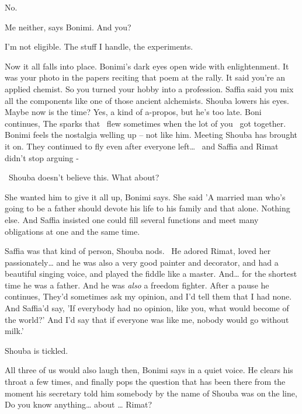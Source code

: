 \documentclass[letterpaper]{article}
\begin{document}
{\textquotedbl}No.{\textquotedbl}

{\textquotedbl}Me neither,{\textquotedbl} says Bonimi. {\textquotedbl}And you?{\textquotedbl} 

{\textquotedbl}I'm not eligible. The stuff I handle, the experiments.{\textquotedbl}

{\textquotedbl}Now it all falls into place.{\textquotedbl} Bonimi's dark eyes open wide with enlightenment.
{\textquotedbl}It was your photo in the papers reciting that poem at the rally. It said you're an applied chemist. So
you turned your hobby into a profession. Saffia said you mix all the components like one of those ancient
alchemists.{\textquotedbl} Shouba lowers his eyes. Maybe now is the time? Yes, a kind of a-propos, but he's too late.
Boni continues, {\textquotedbl}The sparks that \ flew sometimes when the lot of you \ got together.{\textquotedbl}
Bonimi feels the nostalgia welling up -- not like him. Meeting Shouba has brought it on. {\textquotedbl}They continued
to fly even after everyone left{\dots} \ and Saffia and Rimat didn't stop arguing -{\textquotedbl}

~Shouba doesn't believe this. {\textquotedbl}What about?{\textquotedbl}

{\textquotedbl}She wanted {him} to give it all up,{\textquotedbl} Bonimi says. {\textquotedbl}She said
'A married man who's going to be a father should devote his life to his family and that alone. Nothing else. And Saffia
insisted one could fill several functions and meet many obligations at one and the same time.{\textquotedbl} 

{\textquotedbl}Saffia was that kind of person,{\textquotedbl} Shouba nods. \ {\textquotedbl}He adored Rimat, loved her
passionately{\dots} and he was also a very good painter and decorator, and had a beautiful singing voice, and played
the fiddle like a master. And{\dots} for the shortest time he was a father. And he was \textit{also} a freedom
fighter.{\textquotedbl} After a pause he continues, {\textquotedbl}They'd sometimes ask my opinion, and I'd tell them
that I had none. And Saffia'd say, 'If everybody had no opinion, like you, what would become of the world?' And I'd say
that if everyone was like me, nobody would go without milk.'{\textquotedbl}

Shouba is tickled.

{\textquotedbl}All three of us would also laugh then,{\textquotedbl} Bonimi says in a quiet voice. He clears his throat
a few times, and finally pops the question that has been there from the moment his secretary told him somebody by the
name of Shouba was on the line, {\textquotedbl}Do you know anything{\dots} about {\dots} Rimat?{\textquotedbl} 
\end{document}
